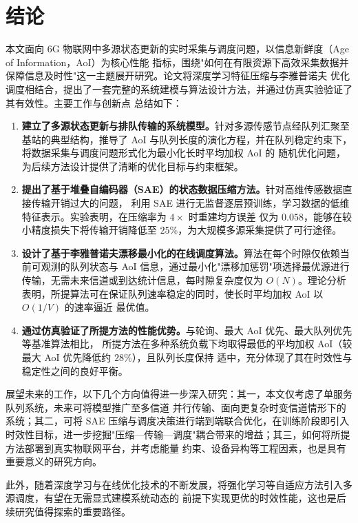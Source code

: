 
\chapter*{结\quad 论}

本文面向 6G 物联网中多源状态更新的实时采集与调度问题，以信息新鲜度（Age of Information，AoI）为核心性能
指标，围绕"如何在有限资源下高效采集数据并保障信息及时性"这一主题展开研究。论文将深度学习特征压缩与李雅普诺夫
优化调度相结合，提出了一套完整的系统建模与算法设计方法，并通过仿真实验验证了其有效性。主要工作与创新点
总结如下：

\begin{enumerate}
  \item \textbf{建立了多源状态更新与排队传输的系统模型。}针对多源传感节点经队列汇聚至基站的典型结构，推导了
        AoI 与队列长度的演化方程，并在队列稳定约束下，将数据采集与调度问题形式化为最小化长时平均加权 AoI 的
        随机优化问题，为后续方法设计提供了清晰的优化目标与约束框架。
  \item \textbf{提出了基于堆叠自编码器（SAE）的状态数据压缩方法。}针对高维传感数据直接传输开销过大的问题，
        利用 SAE 进行无监督逐层预训练，学习数据的低维特征表示。实验表明，在压缩率为 $4\times$ 时重建均方误差
        仅为 $0.058$，能够在较小精度损失下将传输开销降低至 $25\%$，为大规模多源采集提供了可行途径。
  \item \textbf{设计了基于李雅普诺夫漂移最小化的在线调度算法。}算法在每个时隙仅依赖当前可观测的队列状态与
        AoI 信息，通过最小化"漂移加惩罚"项选择最优源进行传输，无需未来信道或到达统计信息，每时隙复杂度仅为
        $O(N)$。理论分析表明，所提算法可在保证队列速率稳定的同时，使长时平均加权 AoI 以 $O(1/V)$ 的速率逼近
        最优值。
  \item \textbf{通过仿真验证了所提方法的性能优势。}与轮询、最大 AoI 优先、最大队列优先等基准算法相比，
        所提方法在多种系统负载下均取得最低的平均加权 AoI（较最大 AoI 优先降低约 $28\%$），且队列长度保持
        适中，充分体现了其在时效性与稳定性之间的良好平衡。
\end{enumerate}

展望未来的工作，以下几个方向值得进一步深入研究：其一，本文仅考虑了单服务队列系统，未来可将模型推广至多信道
并行传输、面向更复杂时变信道情形下的系统；其二，可将 SAE 压缩与调度决策进行端到端联合优化，在训练阶段即引入
时效性目标，进一步挖掘"压缩—传输—调度"耦合带来的增益；其三，如何将所提方法部署到真实物联网平台，并考虑能量
约束、设备异构等工程因素，也是具有重要意义的研究方向。

此外，随着深度学习与在线优化技术的不断发展，将强化学习等自适应方法引入多源调度，有望在无需显式建模系统动态的
前提下实现更优的时效性能，这也是后续研究值得探索的重要路径。
